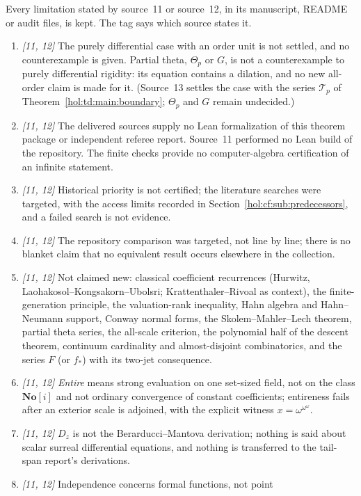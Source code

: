 \documentclass[11pt]{article}
\numberwithin{equation}{section}
\theoremstyle{definition}
\theoremstyle{remark}
\newcommand{\No}{\mathbf{No}}
\begin{document}
Every limitation stated by source~11 or source~12, in its manuscript, README
or audit files, is kept. The tag says which source states it.
\begin{enumerate}[label=\textup{(C\arabic*)}]
\item \emph{[11, 12]} The purely differential case with an order unit is not
settled, and no counterexample is given. Partial theta, $\Theta_p$ or $G$,
is not a counterexample to purely differential rigidity: its equation
contains a dilation, and no new all-order claim is made for it. (Source~13
settles the case with the series $\mathcal T_p$ of
Theorem~\ref{hol:td:main:boundary}; $\Theta_p$ and $G$ remain undecided.)
\item \emph{[11, 12]} The delivered sources supply no Lean formalization of
this theorem package or independent referee report. Source~11 performed no
Lean build of the repository. The finite checks provide no computer-algebra
certification of an infinite statement.
\item \emph{[11, 12]} Historical priority is not certified; the literature
searches were targeted, with the access limits recorded in
Section~\ref{hol:cf:sub:predecessors}, and a failed search is not evidence.
\item \emph{[11, 12]} The repository comparison was targeted, not line by
line; there is no blanket claim that no equivalent result occurs elsewhere
in the collection.
\item \emph{[11, 12]} Not claimed new: classical coefficient recurrences
(Hurwitz, Laohakosol--Kongsakorn--Ubolsri; Krattenthaler--Rivoal as context),
the finite-generation principle, the valuation-rank inequality, Hahn algebra
and Hahn--Neumann support, Conway normal forms, the Skolem--Mahler--Lech
theorem, partial theta series, the all-scale criterion, the polynomial half of
the descent theorem, continuum cardinality and almost-disjoint combinatorics,
and the series $F$ (or $f_*$) with its two-jet consequence.
\item \emph{[11, 12]} \emph{Entire} means strong evaluation on one set-sized
field, not on the class $\No[i]$ and not ordinary convergence of constant
coefficients; entireness fails after an exterior scale is adjoined, with the
explicit witness $x=\omega^{\omega^\omega}$.
\item \emph{[11, 12]} $D_z$ is not the Berarducci--Mantova derivation; nothing
is said about scalar surreal differential equations, and nothing is
transferred to the tail-span report's derivations.
\item \emph{[11, 12]} Independence concerns formal functions, not point

\end{enumerate}
\end{document}
